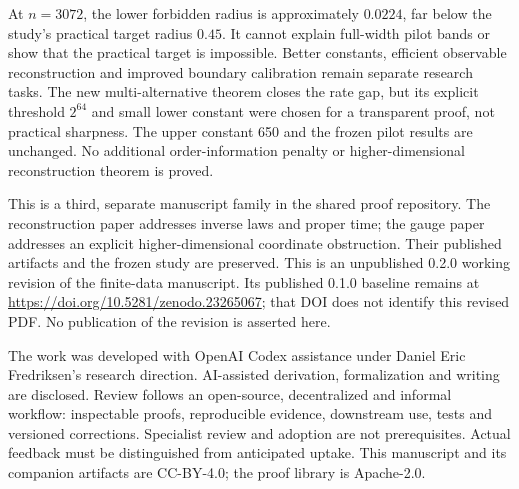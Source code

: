 \documentclass[11pt]{article}
\theoremstyle{remark}
\begin{document}
At $n=3072$, the lower forbidden radius is approximately $0.0224$,
far below the study's practical target radius $0.45$.
It cannot explain full-width pilot bands or show that the practical
target is impossible. Better constants, efficient observable
reconstruction and improved boundary calibration remain separate
research tasks. The new multi-alternative theorem closes the rate gap,
but its explicit threshold $2^{64}$ and small lower constant were chosen
for a transparent proof, not practical sharpness. The upper constant
650 and the frozen pilot results are unchanged.
No additional order-information penalty or higher-dimensional
reconstruction theorem is proved.

This is a third, separate manuscript family in the shared proof
repository. The reconstruction paper \cite{Reconstruction} addresses
inverse laws and proper time; the gauge paper \cite{Gauge} addresses
an explicit higher-dimensional coordinate obstruction. Their published
artifacts and the frozen study are preserved. This is an unpublished
0.2.0 working revision of the finite-data manuscript. Its published
0.1.0 baseline remains at
\url{https://doi.org/10.5281/zenodo.23265067}; that DOI does not identify
this revised PDF. No publication of the revision is asserted here.

The work was developed with OpenAI Codex assistance under Daniel Eric
Fredriksen's research direction. AI-assisted derivation, formalization
and writing are disclosed. Review follows an open-source,
decentralized and informal workflow: inspectable proofs, reproducible
evidence, downstream use, tests and versioned corrections. Specialist
review and adoption are not prerequisites. Actual feedback must be
distinguished from anticipated uptake. This manuscript and its
companion artifacts are CC-BY-4.0; the proof library is Apache-2.0.
\end{document}
